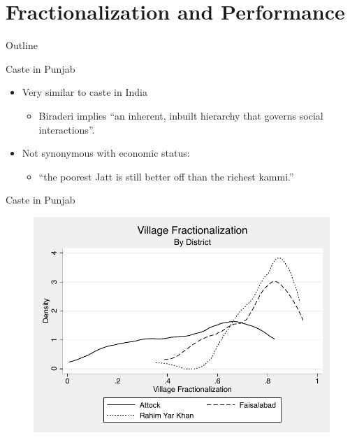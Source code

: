 \documentclass{beamer}
\begin{document}
\section{Fractionalization and Performance}\label{}
\begin{frame}{Outline}
	\tableofcontents[currentsection]
\end{frame}

\begin{frame}{Caste in Punjab}
\begin{itemize}
	\item Very similar to caste in India
	\begin{itemize}
		\item Biraderi implies ``an inherent, inbuilt hierarchy that governs social interactions''\citep[p. 29]{Gazdar:2007vt}.	
	\end{itemize}
	\item Not synonymous with economic status:
	\begin{itemize}
		\item ``the poorest Jatt is still better off than the richest kammi.'' \citep[p. 13]{Gazdar:2007vt} 
	\end{itemize}
\end{itemize}
\end{frame}
	
\begin{frame}{Caste in Punjab}
	\begin{figure}[htb]
		\begin{center}
		\includegraphics[scale=0.6]{graphs/village_frac_by_district.pdf}
		\end{center}
	\end{figure}		
\end{frame}
\end{document}
